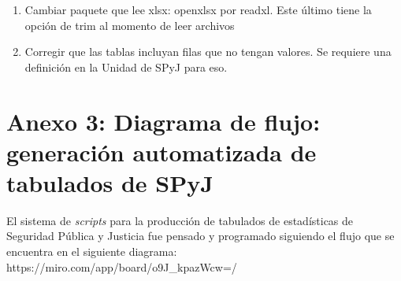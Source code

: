 \documentclass[
  spanish,
]{book}
\begin{document}
\begin{enumerate}
\def\labelenumi{\arabic{enumi}.}
\item
  Cambiar paquete que lee xlsx: openxlsx por readxl. Este último tiene la opción de trim al momento de leer archivos
\item
  Corregir que las tablas incluyan filas que no tengan valores. Se requiere una definición en la Unidad de SPyJ para eso.
\end{enumerate}

\hypertarget{anexo3}{%
\chapter*{Anexo 3: Diagrama de flujo: generación automatizada de tabulados de SPyJ}\label{anexo3}}

El sistema de \emph{scripts} para la producción de tabulados de estadísticas de Seguridad Pública y Justicia fue pensado y programado siguiendo el flujo que se encuentra en el siguiente diagrama: https://miro.com/app/board/o9J\_kpazWcw=/

  
\end{document}
